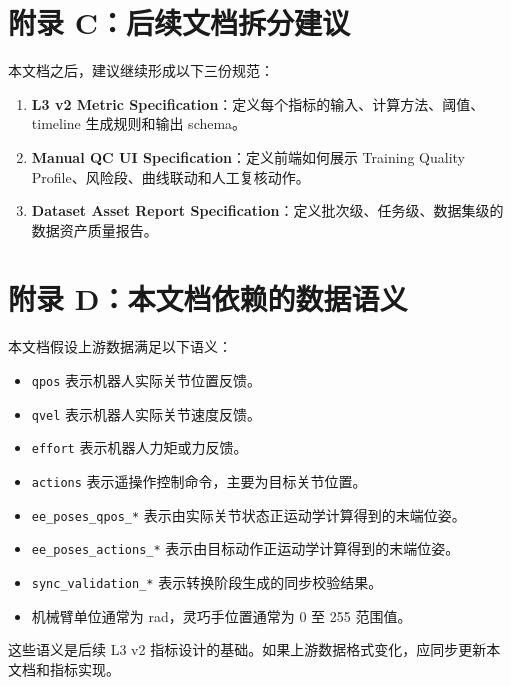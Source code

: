 \documentclass[UTF8,zihao=-4]{ctexart}
\begin{document}
\section{附录 C：后续文档拆分建议}

本文档之后，建议继续形成以下三份规范：

\begin{enumerate}
  \item \textbf{L3 v2 Metric Specification}：定义每个指标的输入、计算方法、阈值、timeline 生成规则和输出 schema。
  \item \textbf{Manual QC UI Specification}：定义前端如何展示 Training Quality Profile、风险段、曲线联动和人工复核动作。
  \item \textbf{Dataset Asset Report Specification}：定义批次级、任务级、数据集级的数据资产质量报告。
\end{enumerate}

\section{附录 D：本文档依赖的数据语义}

本文档假设上游数据满足以下语义：

\begin{itemize}
  \item \texttt{qpos} 表示机器人实际关节位置反馈。
  \item \texttt{qvel} 表示机器人实际关节速度反馈。
  \item \texttt{effort} 表示机器人力矩或力反馈。
  \item \texttt{actions} 表示遥操作控制命令，主要为目标关节位置。
  \item \texttt{ee\_poses\_qpos\_*} 表示由实际关节状态正运动学计算得到的末端位姿。
  \item \texttt{ee\_poses\_actions\_*} 表示由目标动作正运动学计算得到的末端位姿。
  \item \texttt{sync\_validation\_*} 表示转换阶段生成的同步校验结果。
  \item 机械臂单位通常为 rad，灵巧手位置通常为 0 至 255 范围值。
\end{itemize}

这些语义是后续 L3 v2 指标设计的基础。如果上游数据格式变化，应同步更新本文档和指标实现。
\end{document}
